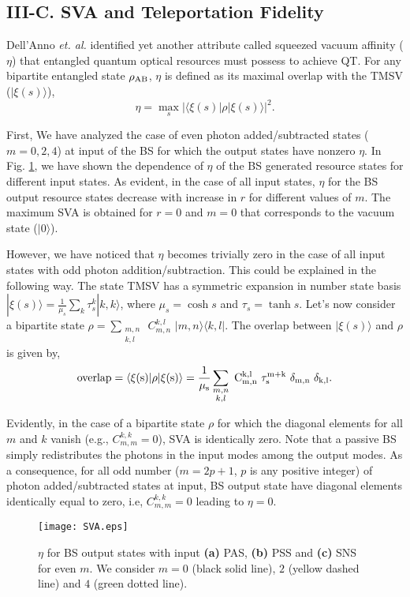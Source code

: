 \documentclass[letter,scriptaddress,twocolumn, prl,showkeys]{revtex4}
\begin{document}
\subsection*{III-C. SVA and Teleportation Fidelity}

Dell'Anno \emph{et. al.} \cite{tp_illuminati} identified yet another attribute called squeezed vacuum affinity ($\eta$) that entangled quantum optical resources must possess to achieve QT.
For any bipartite entangled state $\rho_{\rm{AB}}$, $\eta$ is defined as its maximal overlap with the TMSV ($|\xi(s)\rangle$),
\begin{equation}
\eta=\max_{s}|\langle \xi(s)|\rho|\xi(s)\rangle|^{2} .
\label{def_sva}
\end{equation} 

First, We have analyzed the case of even photon added/subtracted states ($m=0,2,4$) at input of the BS for which the output states have nonzero $\eta$. 
In Fig. \ref{fig_sva}, we have shown the dependence of $\eta$ of the BS generated resource states for different input states.
As evident, in the case of all input states, $\eta$ for the BS output resource states decrease with increase in $r$ for different values of $m$. 
The maximum SVA is obtained for $r=0$ and $m=0$ that corresponds to the vacuum state ($|0\rangle$).

However, we have noticed that $\eta$ becomes trivially zero in the case of all input states with odd photon addition/subtraction.
This could be explained in the following way.
The state TMSV has a symmetric expansion in number state basis $|\xi(s)\rangle=\frac{1}{\mu_{s}}\sum_{k}\tau_{s}^{k}|k,k\rangle$, where $\mu_{s}=\cosh s$ and $\tau_{s}=\tanh s$. Let's now consider a bipartite state $\rho=\sum_{\substack{m,n\\ k,l}}~C_{m,n}^{k,l}$ $|m,n\rangle\langle k,l|$. The overlap between $|\xi(s)\rangle$ and $\rho$ is given by,
\begin{equation}
\rm{overlap}=\langle \xi(s)|\rho|\xi(s)\rangle= \frac{1}{\mu_{s}}\sum_{\substack{m,n\\ k,l}}~C_{m,n}^{k,l}~\tau_{s}^{m+k}~\delta_{m,n}~\delta_{k,l}.
\label{overlap}
\end{equation}

Evidently, in the case of a bipartite state $\rho$ for which the diagonal elements for all $m$ and $k$ vanish (e.g., $C_{m,m}^{k,k}=0$), SVA is identically zero. 
Note that a passive BS simply redistributes the photons in the input modes among the output modes. 
As a consequence, for all odd number ($m=2p+1$, $p$ is any positive integer) of photon added/subtracted states at input, BS output state have diagonal elements identically equal to zero, i.e, $C_{m,m}^{k,k}=0$ leading to $\eta=0$.
\begin{figure}[h]
\texttt{[image: SVA.eps]}
\caption{$\eta$ for BS output states with input {\bf (a)} PAS, {\bf (b)} PSS and {\bf (c)} SNS for even $m$. We consider $m=0$ (black solid line), $2$ (yellow dashed line) and $4$ (green dotted line). \label{fig_sva}}
\end{figure}
\end{document}
